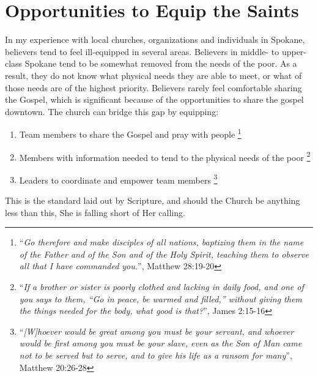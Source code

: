 \documentclass[12pt]{article}
\begin{document}
\section{Opportunities to Equip the Saints}

    In my experience with local churches, organizations and individuals in Spokane, believers tend to feel ill-equipped in several areas.
    Believers in middle- to upper-class Spokane tend to be somewhat removed from the needs of the poor.
    As a result, they do not know what physical needs they are able to meet, or what of those needs are of the highest priority.
    Believers rarely feel comfortable sharing the Gospel, which is significant because of the opportunities to share the gospel downtown.
    The church can bridge this gap by equipping:
    \begin{enumerate}
        \item Team members to share the Gospel and pray with people
          \footnote{``\textit{Go therefore and make disciples of all nations, baptizing them in the name of the Father and of the Son and of the Holy Spirit, teaching them to observe all that I have commanded you.}'', Matthew 28:19-20}
        \item Members with information needed to tend to the physical needs of the poor
          \footnote{``\textit{If a brother or sister is poorly clothed and lacking in daily food, and one of you says to them, “Go in peace, be warmed and filled,” without giving them the things needed for the body, what good is that?}'', James 2:15-16}
        \item Leaders to coordinate and empower team members
          \footnote{``\textit{[W]hoever would be great among you must be your servant, and whoever would be first among you must be your slave, even as the Son of Man came not to be served but to serve, and to give his life as a ransom for many}'', Matthew 20:26-28}
    \end{enumerate}
    This is the standard laid out by Scripture, and should the Church be anything less than this, She is falling short of Her calling.
\end{document}
